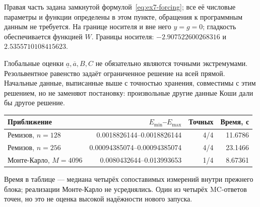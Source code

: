 Правая часть задана замкнутой формулой~\eqref{eq:ex7-forcing}; все её числовые параметры и функции определены в этом пункте, обращения к программным данным не требуется. На границе носителя и вне него $y=g=0$; гладкость обеспечивается функцией $W$. Границы носителя: $-2.907522600268316$ и $2.5355710108415623$.

Глобальные оценки $\underline a,\overline a,B,C$ не обязательно являются точными экстремумами. Резольвентное равенство задаёт ограниченное решение на всей прямой. Начальные данные, выписанные выше с точностью хранения, совместимы с этим решением, но не заменяют постановку: произвольные другие данные Коши дали бы другое решение.

\begin{center}\label{tab:ex7}\begin{tabular}{lrrr}\toprule Приближение&$E_{\min}$--$E_{\max}$&Точных&Время, с\\\midrule

Ремизов, $n=128$&0.0018826144--0.0018826144&4/4&11.6786\\

Ремизов, $n=256$&0.00094385074--0.00094385074&4/4&23.1466\\

Монте-Карло, $M=4096$&0.0080432644--0.013993653&1/4&8.67361\\

\bottomrule\end{tabular}\end{center}

Время в таблице --- медиана четырёх сопоставимых измерений внутри прежнего блока; реализации Монте-Карло не усреднялись. Один из четырёх MC-ответов точен, но это не оценка высокой надёжности нового запуска.

\normalsize\setlength{\abovedisplayskip}{6pt}\setlength{\belowdisplayskip}{6pt}

